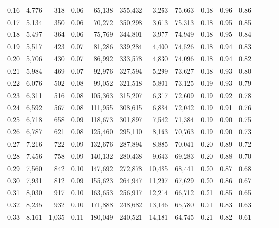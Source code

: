 \begin{tabular}{rrrrrrrrrrrrrr}
0.16 &   4,776 &    318 &  0.06 &   65,138 &  355,432 &   3,263 &  75,663 &  0.18 &  0.96 &      0.86 \\
0.17 &   5,134 &    350 &  0.06 &   70,272 &  350,298 &   3,613 &  75,313 &  0.18 &  0.95 &      0.85 \\
0.18 &   5,497 &    364 &  0.06 &   75,769 &  344,801 &   3,977 &  74,949 &  0.18 &  0.95 &      0.84 \\
0.19 &   5,517 &    423 &  0.07 &   81,286 &  339,284 &   4,400 &  74,526 &  0.18 &  0.94 &      0.83 \\
0.20 &   5,706 &    430 &  0.07 &   86,992 &  333,578 &   4,830 &  74,096 &  0.18 &  0.94 &      0.82 \\
0.21 &   5,984 &    469 &  0.07 &   92,976 &  327,594 &   5,299 &  73,627 &  0.18 &  0.93 &      0.80 \\
0.22 &   6,076 &    502 &  0.08 &   99,052 &  321,518 &   5,801 &  73,125 &  0.19 &  0.93 &      0.79 \\
0.23 &   6,311 &    516 &  0.08 &  105,363 &  315,207 &   6,317 &  72,609 &  0.19 &  0.92 &      0.78 \\
0.24 &   6,592 &    567 &  0.08 &  111,955 &  308,615 &   6,884 &  72,042 &  0.19 &  0.91 &      0.76 \\
0.25 &   6,718 &    658 &  0.09 &  118,673 &  301,897 &   7,542 &  71,384 &  0.19 &  0.90 &      0.75 \\
0.26 &   6,787 &    621 &  0.08 &  125,460 &  295,110 &   8,163 &  70,763 &  0.19 &  0.90 &      0.73 \\
0.27 &   7,216 &    722 &  0.09 &  132,676 &  287,894 &   8,885 &  70,041 &  0.20 &  0.89 &      0.72 \\
0.28 &   7,456 &    758 &  0.09 &  140,132 &  280,438 &   9,643 &  69,283 &  0.20 &  0.88 &      0.70 \\
0.29 &   7,560 &    842 &  0.10 &  147,692 &  272,878 &  10,485 &  68,441 &  0.20 &  0.87 &      0.68 \\
0.30 &   7,931 &    812 &  0.09 &  155,623 &  264,947 &  11,297 &  67,629 &  0.20 &  0.86 &      0.67 \\
0.31 &   8,030 &    917 &  0.10 &  163,653 &  256,917 &  12,214 &  66,712 &  0.21 &  0.85 &      0.65 \\
0.32 &   8,235 &    932 &  0.10 &  171,888 &  248,682 &  13,146 &  65,780 &  0.21 &  0.83 &      0.63 \\
0.33 &   8,161 &  1,035 &  0.11 &  180,049 &  240,521 &  14,181 &  64,745 &  0.21 &  0.82 &      0.61 \\

\end{tabular}
